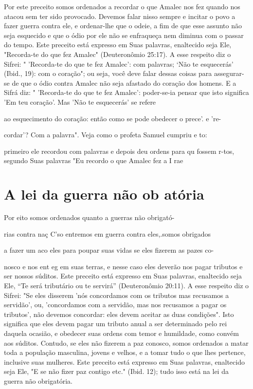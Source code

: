 Por este preceito somos ordenados a recordar o que Amalec nos fez quando
nos atacou sem ter sido provocado. Devemos falar nisso sempre e inci­tar
o povo a fazer guerra contra ele, e ordenar-lhe que o odeie, a fim de
que esse assunto não seja esquecido e que o ódio por ele não se
enfraqueça nem diminua com o passar do tempo. Este preceito está
expresso em Suas palavras, enaltecido seja Ele, "Recorda-te do que fez
Amalec" (Deuteronômio 25:17). A esse respeito diz o Sifrei: "
'Recorda-te do que te fez Amalec': com palavras; `Não te esquecerás'
(Ibid., 19): com o coração"; ou seja, você deve falar dessas coisas para
assegurar-se de que o ódio contra Amalec não seja afastado do cora­ção
dos homens. E a Sifrá diz: " 'Recorda-te do que te fez Amalec':
poder-se-ia pensar que isto significa 'Em teu coração'. Mas 'Não te
esquecerás' se refere

ao esquecimento do coração: então como se pode obedecer o prece'. e 're-

cordar'? Com a palavra". Veja como o profeta Samuel cumpriu e to:

primeiro ele recordou com palavras e depois deu ordens para qu fossem
r-tos, segundo Suas palavras "Eu recordo o que Amalec fez a I rae

\section{A lei da guerra não ob atória}

Por eito somos ordenados quanto a guerras não obrigató-

rias contra naç C'so entremos em guerra contra eles,.somos obrigados

a fazer um aco eles para poupar suas vidas se eles fizerem as pazes co-

nosco e nos ent eg em suas terras, e nesse caso eles deverão nos pagar
tribu­tos e ser nossos súditos. Este preceito está expresso em Suas
palavras, enalteci­do seja Ele, ``Te será tributário ou te servirá''
(Deuteronômio 20:11). A esse res­peito diz o Sifrei: "Se eles disserem
'nós concordamos com os tributos mas re­cusamos a servidão', ou,
'concordamos com a servidão, mas nos recusamos a pagar os tributos', não
devemos concordar: eles devem aceitar as duas condi­ções". Isto
significa que eles devem pagar um tributo anual a ser determinado pelo
rei daquela ocasião, e obedecer suas ordens com temor e humildade, co­mo
convém aos súditos. Contudo, se eles não fizerem a paz conosco, somos
ordenados a matar toda a população masculina, jovens e velhos, e a tomar
tudo o que lhes pertence, inclusive suas mulheres. Este preceito está
expresso em Suas palavras, enaltecido seja Ele, "E se não fizer paz
contigo etc." (Ibid. 12); tudo isso está na lei da guerra não
obrigatória.

